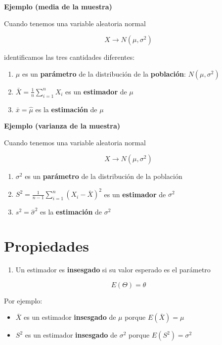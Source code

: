 \documentclass[
]{book}
\providecommand{\tightlist}{%
  \setlength{\itemsep}{0pt}\setlength{\parskip}{0pt}}
\begin{document}
\textbf{Ejemplo (media de la muestra)}

Cuando tenemos una variable aleatoria normal

\[X \rightarrow N(\mu, \sigma^2)\]

identificamos las tres cantidades diferentes:

\begin{enumerate}
\def\labelenumi{\arabic{enumi}.}
\tightlist
\item
  \(\mu\) es un \textbf{parámetro} de la distribución de la \textbf{población}: \(N(\mu, \sigma^2)\)
\item
  \(\bar{X}=\frac{1}{n} \sum_{i=1}^n X_i\) es un \textbf{estimador} de \(\mu\)
\item
  \(\bar{x}=\hat{\mu}\) es la \textbf{estimación} de \(\mu\)
\end{enumerate}

\textbf{Ejemplo (varianza de la muestra)}

Cuando tenemos una variable aleatoria normal

\[X \rightarrow N(\mu, \sigma^2)\]

\begin{enumerate}
\def\labelenumi{\arabic{enumi}.}
\tightlist
\item
  \(\sigma^2\) es un \textbf{parámetro} de la distribución de la población
\item
  \(S^2=\frac{1}{n-1} \sum_{i=1}^n (X_i-\bar{X})^2\) es un \textbf{estimador} de \(\sigma^2\)
\item
  \(s^2=\hat{\sigma}^2\) es la \textbf{estimación} de \(\sigma^2\)
\end{enumerate}

\hypertarget{propiedades}{%
\section{Propiedades}\label{propiedades}}

\begin{enumerate}
\def\labelenumi{\arabic{enumi}.}
\tightlist
\item
  Un estimador es \textbf{insesgado} si su valor esperado es el parámetro
\end{enumerate}

\[E(\Theta)=\theta\]

Por ejemplo:

\begin{itemize}
\item
  \(\bar{X}\) es un estimador \textbf{insesgado} de \(\mu\) porque \(E(\bar{X})=\mu\)
\item
  \(S^2\) es un estimador \textbf{insesgado} de \(\sigma^2\) porque \(E(S^2)=\sigma^2\)
\end{itemize}
\end{document}
